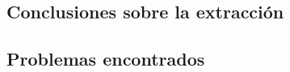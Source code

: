 \chapter{\ChapterThree{}}
\lhead{\emph{\ChapterThree{}}}

\section{Conclusiones sobre la extracción}


\section{Problemas encontrados}
